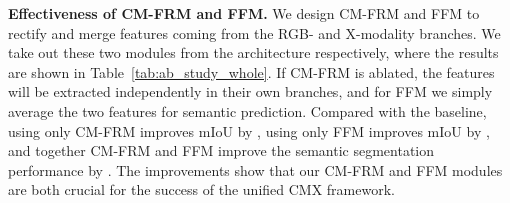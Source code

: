 \documentclass[journal]{IEEEtran}
\begin{document}
\noindent\textbf{Effectiveness of CM-FRM and FFM.}
We design CM-FRM and FFM to rectify and merge features coming from the RGB- and X-modality branches. We take out these two modules from the architecture respectively, where the results are shown in Table~\ref{tab:ab_study_whole}.
If CM-FRM is ablated, the features will be extracted independently in their own branches, and for FFM we simply average the two features for semantic prediction.
Compared with the baseline, using only CM-FRM improves mIoU by , using only FFM improves mIoU by , and together CM-FRM and FFM improve the semantic segmentation performance by . The improvements show that our CM-FRM and FFM modules are both crucial for the success of the unified CMX framework.
\begin{table}[!t]
\begin{center}
    \caption{\textsc{Ablation study of CM-FRM and FFM on NYU Depth V2 \textit{test} set. \textit{Avg.} is the average fusion.}}
    \label{tab:ab_study_whole}
         \end{center}
\end{table}
\end{document}
